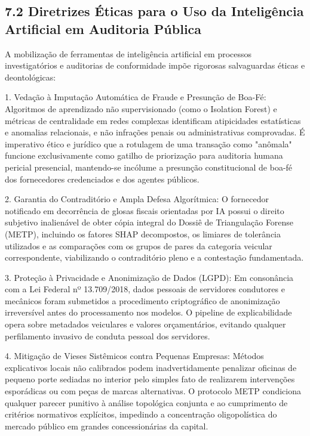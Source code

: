 \documentclass[10pt,a4paper,journal]{article}
\begin{document}
\subsection{7.2 Diretrizes Éticas para o Uso da Inteligência Artificial em Auditoria Pública}
A mobilização de ferramentas de inteligência artificial em processos investigatórios e auditorias de conformidade impõe rigorosas salvaguardas éticas e deontológicas:

1. Vedação à Imputação Automática de Fraude e Presunção de Boa-Fé: Algoritmos de aprendizado não supervisionado (como o Isolation Forest) e métricas de centralidade em redes complexas identificam atipicidades estatísticas e anomalias relacionais, e não infrações penais ou administrativas comprovadas. É imperativo ético e jurídico que a rotulagem de uma transação como "anômala" funcione exclusivamente como gatilho de priorização para auditoria humana pericial presencial, mantendo-se incólume a presunção constitucional de boa-fé dos fornecedores credenciados e dos agentes públicos.

2. Garantia do Contraditório e Ampla Defesa Algorítmica: O fornecedor notificado em decorrência de glosas fiscais orientadas por IA possui o direito subjetivo inalienável de obter cópia integral do Dossiê de Triangulação Forense (METP), incluindo os fatores SHAP decompostos, os limiares de tolerância utilizados e as comparações com os grupos de pares da categoria veicular correspondente, viabilizando o contraditório pleno e a contestação fundamentada.

3. Proteção à Privacidade e Anonimização de Dados (LGPD): Em consonância com a Lei Federal nº 13.709/2018, dados pessoais de servidores condutores e mecânicos foram submetidos a procedimento criptográfico de anonimização irreversível antes do processamento nos modelos. O pipeline de explicabilidade opera sobre metadados veiculares e valores orçamentários, evitando qualquer perfilamento invasivo de conduta pessoal dos servidores.

4. Mitigação de Vieses Sistêmicos contra Pequenas Empresas: Métodos explicativos locais não calibrados podem inadvertidamente penalizar oficinas de pequeno porte sediadas no interior pelo simples fato de realizarem intervenções esporádicas ou com peças de marcas alternativas. O protocolo METP condiciona qualquer parecer punitivo à análise topológica conjunta e ao cumprimento de critérios normativos explícitos, impedindo a concentração oligopolística do mercado público em grandes concessionárias da capital.
\end{document}
